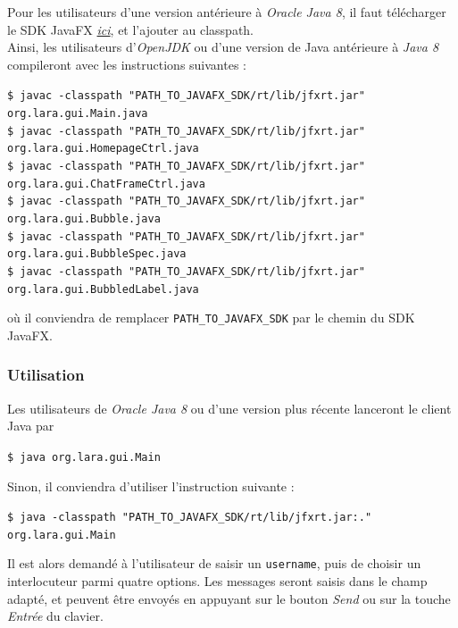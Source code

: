\documentclass[10pt,a4paper]{article}
\begin{document}
Pour les utilisateurs d'une version antérieure à \textit{Oracle Java 8}, il faut télécharger le SDK JavaFX \href{https://gluonhq.com/products/javafx/}{\textit{ici}}, et l'ajouter au classpath. \\

Ainsi, les utilisateurs d'\textit{OpenJDK} ou d'une version de Java antérieure à \textit{Java 8} compileront avec les instructions suivantes :
\begin{center}
	\texttt{\$ javac -classpath "PATH\_TO\_JAVAFX\_SDK/rt/lib/jfxrt.jar" org.lara.gui.Main.java} \\
	\texttt{\$ javac -classpath "PATH\_TO\_JAVAFX\_SDK/rt/lib/jfxrt.jar" org.lara.gui.HomepageCtrl.java} \\
	\texttt{\$ javac -classpath "PATH\_TO\_JAVAFX\_SDK/rt/lib/jfxrt.jar" org.lara.gui.ChatFrameCtrl.java} \\
	\texttt{\$ javac -classpath "PATH\_TO\_JAVAFX\_SDK/rt/lib/jfxrt.jar" org.lara.gui.Bubble.java} \\
	\texttt{\$ javac -classpath "PATH\_TO\_JAVAFX\_SDK/rt/lib/jfxrt.jar" org.lara.gui.BubbleSpec.java} \\
	\texttt{\$ javac -classpath "PATH\_TO\_JAVAFX\_SDK/rt/lib/jfxrt.jar" org.lara.gui.BubbledLabel.java}
\end{center}
où il conviendra de remplacer \texttt{PATH\_TO\_JAVAFX\_SDK} par le chemin du SDK JavaFX.

\subsubsection{Utilisation}

Les utilisateurs de \textit{Oracle Java 8} ou d'une version plus récente lanceront le client Java par
\begin{center}
	\texttt{\$ java org.lara.gui.Main}
\end{center}

Sinon, il conviendra d'utiliser l'instruction suivante :
\begin{center}
	\texttt{\$ java -classpath "PATH\_TO\_JAVAFX\_SDK/rt/lib/jfxrt.jar:." org.lara.gui.Main}
\end{center}

Il est alors demandé à l'utilisateur de saisir un \texttt{username}, puis de choisir un interlocuteur parmi quatre options. Les messages seront saisis dans le champ adapté, et peuvent être envoyés en appuyant sur le bouton \textit{Send} ou sur la touche \textit{Entrée} du clavier.
\end{document}
